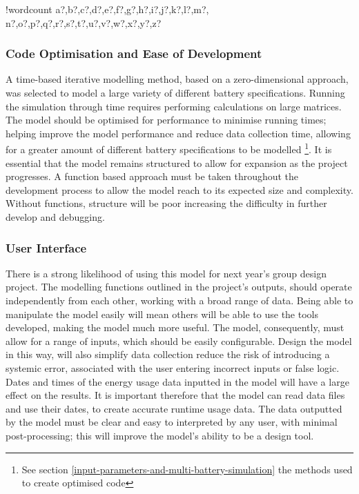 \documentclass[fontsize=9.5pt]{extarticle}
\numberwithin{figure}{section} %
\newcounter{words}
\newenvironment{counted}{%
  \setcounter{words}{0}
  \SearchList!{wordcount}{\stepcounter{words}}
    {a?,b?,c?,d?,e?,f?,g?,h?,i?,j?,k?,l?,m?,
    n?,o?,p?,q?,r?,s?,t?,u?,v?,w?,x?,y?,z?}
  \UndoBoundary{'}
  \SearchOrder{p;}}{%
  \StopSearching}
\begin{document}
\begin{counted}
\subsubsection{Code Optimisation and Ease of
Development}\label{code-optimisation-and-ease-of-development}

A time-based iterative modelling method, based on a zero-dimensional
approach, was selected to model a large variety of different battery
specifications. Running the simulation through time requires performing
calculations on large matrices. The model should be optimised for
performance to minimise running times; helping improve the model
performance and reduce data collection time, allowing for a greater
amount of different battery specifications to be modelled
\footnote{See section \ref{input-parameters-and-multi-battery-simulation} the methods used to create optimised code}.
It is essential that the model remains structured to allow for expansion
as the project progresses. A function based approach must be taken
throughout the development process to allow the model reach to its
expected size and complexity. Without functions, structure will be poor
increasing the difficulty in further develop and debugging.

\subsubsection{User Interface}\label{user-interface}

There is a strong likelihood of using this model for next year's group
design project. The modelling functions outlined in the project's
outputs, should operate independently from each other, working with a
broad range of data. Being able to manipulate the model easily will mean
others will be able to use the tools developed, making the model much
more useful. The model, consequently, must allow for a range of inputs,
which should be easily configurable. Design the model in this way, will
also simplify data collection reduce the risk of introducing a systemic
error, associated with the user entering incorrect inputs or false
logic. Dates and times of the energy usage data inputted in the model
will have a large effect on the results. It is important therefore that
the model can read data files and use their dates, to create accurate
runtime usage data. The data outputted by the model must be clear and
easy to interpreted by any user, with minimal post-processing; this will
improve the model's ability to be a design tool.


\end{counted}
\end{document}
